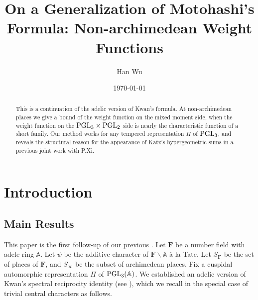 \documentclass[A4]{amsart}
\title{On a Generalization of Motohashi's Formula: Non-archimedean Weight Functions}
\author{Han Wu}
\date{\today}
\numberwithin{equation}{section} \everymath{\displaystyle}
\newcommand{\PGL}{{\rm PGL}}
\newcommand{\F}{\mathbf{F}}
\newcommand{\A}{\mathbb{A}}
\begin{document}
\begin{abstract}
	This is a continuation of the adelic version of Kwan's formula. At non-archimedean places we give a bound of the weight function on the mixed moment side, when the weight function on the $\PGL_3 \times \PGL_2$ side is nearly the characteristic function of a short family. Our method works for any tempered representation $\Pi$ of $\PGL_3$, and reveals the structural reason for the appearance of Katz's hypergeometric sums in a previous joint work with P.Xi.
\end{abstract}

	\maketitle
	
	\tableofcontents
	
\section{Introduction}


	\subsection{Main Results}
	
	This paper is the first follow-up of our previous \cite{Wu24+}. Let $\F$ be a number field with adele ring $\A$. Let $\psi$ be the additive character of $\F \backslash \A$ \`a la Tate. Let $S_{\F}$ be the set of places of $\F$, and $S_{\infty}$ be the subset of archimedean places. Fix a cuspidal automorphic representation $\Pi$ of $\PGL_3(\A)$. We established an adelic version of Kwan's spectral reciprocity identity (see \cite[Theorem 1.1 \& (5.19)-(5.21)]{Wu24+}), which we recall in the special case of trivial central characters as follows.
	
\end{document}
